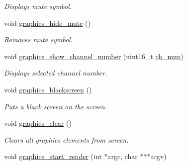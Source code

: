 \begin{DoxyCompactItemize}
\begin{DoxyCompactList}\small\item\em Displays mute symbol. \end{DoxyCompactList}\item 
void \hyperlink{group__graphics_ga56554c1a2cf638c4a3804f36656a75f9}{graphics\+\_\+hide\+\_\+mute} ()\hypertarget{group__graphics_ga56554c1a2cf638c4a3804f36656a75f9}{}\label{group__graphics_ga56554c1a2cf638c4a3804f36656a75f9}

\begin{DoxyCompactList}\small\item\em Removes mute symbol. \end{DoxyCompactList}\item 
void \hyperlink{group__graphics_ga6832a9b03441e5a9d47d3c8e3e01a591}{graphics\+\_\+show\+\_\+channel\+\_\+number} (uint16\+\_\+t \hyperlink{structures_8h_abcdde739cb26f5c6c2c0b87e83d1f421}{ch\+\_\+num})\hypertarget{group__graphics_ga6832a9b03441e5a9d47d3c8e3e01a591}{}\label{group__graphics_ga6832a9b03441e5a9d47d3c8e3e01a591}

\begin{DoxyCompactList}\small\item\em Displays selected channel number. \end{DoxyCompactList}\item 
void \hyperlink{group__graphics_gac220b5d62d022399bb1e3a9cf6b1dce2}{graphics\+\_\+blackscreen} ()\hypertarget{group__graphics_gac220b5d62d022399bb1e3a9cf6b1dce2}{}\label{group__graphics_gac220b5d62d022399bb1e3a9cf6b1dce2}

\begin{DoxyCompactList}\small\item\em Puts a black screen on the screen. \end{DoxyCompactList}\item 
void \hyperlink{group__graphics_ga46d440f27511750ed679ec47c7491579}{graphics\+\_\+clear} ()\hypertarget{group__graphics_ga46d440f27511750ed679ec47c7491579}{}\label{group__graphics_ga46d440f27511750ed679ec47c7491579}

\begin{DoxyCompactList}\small\item\em Clears all graphics elements from screen. \end{DoxyCompactList}\item 
void \hyperlink{group__graphics_ga96cea86bf40f2181cadf6686b82f28a3}{graphics\+\_\+start\+\_\+render} (int $\ast$argc, char $\ast$$\ast$$\ast$argv)\hypertarget{group__graphics_ga96cea86bf40f2181cadf6686b82f28a3}{}\label{group__graphics_ga96cea86bf40f2181cadf6686b82f28a3}


\end{DoxyCompactItemize}
